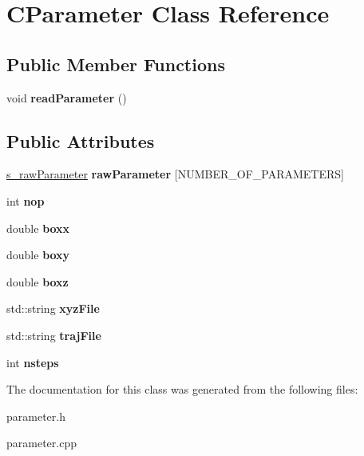 \hypertarget{classCParameter}{}\section{C\+Parameter Class Reference}
\label{classCParameter}
\subsection*{Public Member Functions}
\begin{DoxyCompactItemize}
\item 
\mbox{\label{classCParameter_a026d8da357935e384b478913e036f3bc}} 
void {\bfseries read\+Parameter} ()
\end{DoxyCompactItemize}
\subsection*{Public Attributes}
\begin{DoxyCompactItemize}
\item 
\mbox{\label{classCParameter_a8c3dd5e12ba81bf46bce96e7172f08d6}} 
\mbox{\hyperlink{structs__rawParameter}{s\+\_\+raw\+Parameter}} {\bfseries raw\+Parameter} \mbox{[}N\+U\+M\+B\+E\+R\+\_\+\+O\+F\+\_\+\+P\+A\+R\+A\+M\+E\+T\+E\+RS\mbox{]}
\item 
\mbox{\label{classCParameter_adce9321ac8e877aff4d4c9fc03f74465}} 
int {\bfseries nop}
\item 
\mbox{\label{classCParameter_ab0abbb096d718eb1deac73e1c47ae324}} 
double {\bfseries boxx}
\item 
\mbox{\label{classCParameter_af770455c1829b9e2ab5cd27b7ea626be}} 
double {\bfseries boxy}
\item 
\mbox{\label{classCParameter_a87d3e3cd240bb45c5d9dcbd6c3cc3bf0}} 
double {\bfseries boxz}
\item 
\mbox{\label{classCParameter_ace7b05009f3403d4abea8a1bea18ded8}} 
std\+::string {\bfseries xyz\+File}
\item 
\mbox{\label{classCParameter_a0b417a4a872ded310baf1c310f55c284}} 
std\+::string {\bfseries traj\+File}
\item 
\mbox{\label{classCParameter_a0d4870d1e8738b7d921e35fa4068b060}} 
int {\bfseries nsteps}
\end{DoxyCompactItemize}


The documentation for this class was generated from the following files\+:\begin{DoxyCompactItemize}
\item 
parameter.\+h\item 
parameter.\+cpp\end{DoxyCompactItemize}
